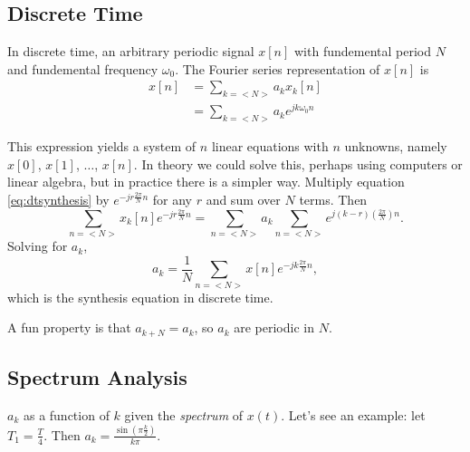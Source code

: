 \subsection{Discrete Time}

In discrete time, an arbitrary periodic signal $x[n]$ with fundemental
period $N$ and fundemental frequency $\omega_0$. The Fourier series
representation of $x[n]$ is
\begin{align}\label{eq:dtsynthesis}
    x[n] & = \sum_{k=<N>} a_k x_k[n]           \\
         & = \sum_{k=<N>} a_k e^{jk\omega_0 n}
\end{align}

This expression yields a system of $n$ linear equations with $n$
unknowns, namely $x[0]$, $x[1]$, $\dots$, $x[n]$. In theory we
could solve this, perhaps using computers or linear algebra, but
in practice there is a simpler way. Multiply equation \ref{eq:dtsynthesis}
by $e^{-jr\frac{2\pi}{N}n}$ for any $r$ and sum over $N$ terms. Then
\begin{equation}
    \sum_{n=<N>} x_k[n] e^{-jr\frac{2\pi}{N}n} = \sum_{n=<N>} a_k \sum_{n=<N>} e^{j(k-r)(\frac{2\pi}{N})n}.
\end{equation}
Solving for $a_k$,
\begin{equation}
    a_k = \frac{1}{N} \sum_{n=<N>} x[n] e^{-jk\frac{2\pi}{N}n},
\end{equation}
which is the synthesis equation in discrete time.

A fun property is that $a_{k+N} = a_k$, so $a_k$ are periodic in $N$.

\subsection{Spectrum Analysis}

$a_k$ as a function of $k$ given the \emph{spectrum} of $x(t)$. Let's see
an example: let $T_1 = \frac{T}{4}$. Then $a_k = \frac{\sin(\pi \frac{k}{2})}{k\pi}$.


